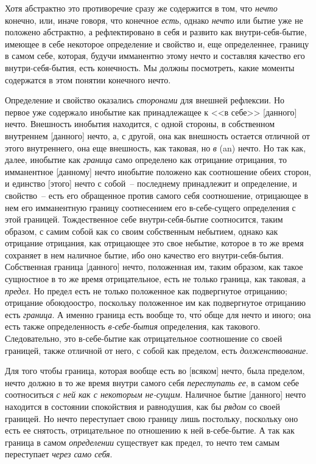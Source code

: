 Хотя абстрактно это противоречие сразу же содержится
в том, что \emph{нечто} конечно, или, иначе говоря, что
конечное \emph{есть}, однако \emph{нечто} или бытие уже не положено
абстрактно, а рефлектировано в себя и развито как внутри-себя-бытие,
имеющее в себе некоторое определение и
свойство и, еще определеннее, границу в самом себе, которая,
будучи имманентно этому нечто и составляя качество
его внутри-себя-бытия, есть конечность. Мы должны посмотреть,
какие моменты содержатся в этом понятии конечного
нечто.

Определение и свойство оказались \emph{сторонами} для
внешней рефлексии. Но первое уже содержало инобытие
как принадлежащее к <<в себе>> [данного] нечто. Внешность
инобытия находится, с одной стороны, в собственном
внутреннем [данного] нечто, а, с другой, она как
внешность остается отличной от этого внутреннего, она
еще внешность, как таковая, но \emph{в} (an) нечто. Но так как,
далее, инобытие как \emph{граница} само определено как отрицание
отрицания, то имманентное [данному] нечто инобытие
положено как соотношение обеих сторон, и единство
[этого] нечто с собой~-- последнему принадлежит и
определение, и свойство~-- есть его обращенное против
самого себя соотношение, отрицающее в нем его имманентную
границу соотнесением его в-себе-сущего определения
с этой границей. Тождественное себе внутри-себя-бытие
соотносится, таким образом, с самим собой как со
своим собственным небытием, однако как отрицание отрицания,
как отрицающее это свое небытие, которое в то
же время сохраняет в нем наличное бытие, ибо оно качество
его внутри-себя-бытия. Собственная граница [данного]
нечто, положенная им, таким образом, как такое сущностное
в то же время отрицательное, есть не только
граница, как таковая, а \emph{предел}. Но предел есть не только
положенное как подвергнутое отрицанию; отрицание
обоюдоостро, поскольку положенное им как подвергнутое
отрицанию есть \emph{граница}. А именно граница есть вообще
то, чт\'о обще для нечто и иного; она есть также определенность
\emph{в-себе-бытия} определения, как такового. Следовательно,
это в-себе-бытие как отрицательное соотношение
со своей границей, также отличной от него, с собой
как пределом, есть \emph{долженствование}.

Для того чтобы граница, которая вообще есть во [всяком]
нечто, была пределом, нечто должно в то же время
внутри самого себя \emph{переступать ее}, в самом себе соотноситься
\emph{с ней как с некоторым не-сущим}. Наличное бытие
[данного] нечто находится в состоянии спокойствия и равнодушия,
как бы \emph{рядом} со своей границей. Но нечто переступает
свою границу лишь постольку, поскольку оно
есть ее снятость, отрицательное по отношению к ней в-себе-бытие.
А так как граница в самом \emph{определении} существует
как предел, то нечто тем самым переступает
\emph{через само себя}.

